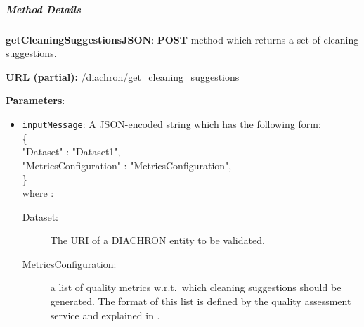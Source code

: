 \subparagraph{Method Details}

\begin{description}

\item{\textbf{getCleaningSuggestionsJSON}:} \textbf{POST} method which returns a set of cleaning suggestions.

\textbf{URL (partial):} \url{/diachron/get_cleaning_suggestions} 

\textbf{Parameters}: 
\begin{itemize}
\item \texttt{inputMessage}: A JSON-encoded string which has the following form: \\
\{ \\
\hspace*{0.5 cm}"Dataset" : "Dataset1", \\
\hspace*{0.5 cm}"MetricsConfiguration" : "MetricsConfiguration", \\ 
\} \\
where : 
\begin{description}
\item[Dataset:] The URI of a DIACHRON entity to be validated. 
\item[MetricsConfiguration:] a list of quality metrics w.r.t.\ which cleaning suggestions should be generated.  The format of this list is defined by the quality assessment service and explained in \cite[section~2.4]{diachron-d5.2}. 
\end{description}


\end{itemize}
\end{description}
